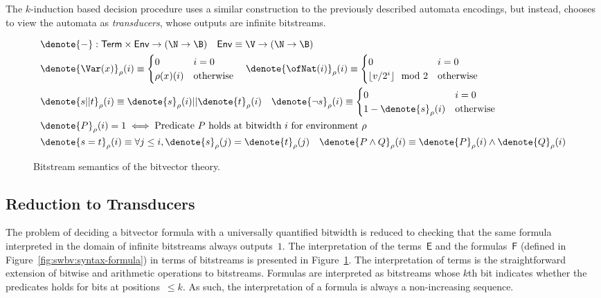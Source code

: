 The $k$-induction based decision procedure uses a similar construction to the
previously described automata encodings, but instead, chooses to view the
automata as \emph{transducers}, whose outputs are infinite bitstreams.

\begin{figure}[t]
\begin{align*}
&\denote{-}: \mathsf{Term} \times \mathsf{Env} \to (\N \to \B) \quad \mathsf{Env} \equiv \V \to (\N \to \B) \\
&\denote{\Var(x)}_\rho(i) \equiv
  \begin{cases}
  0 & i = 0 \\
  \rho(x)(i) & \text{otherwise}
  \end{cases}
\quad \denote{\ofNat(i)}_\rho(i) \equiv
  \begin{cases}
  0 & i = 0 \\
  \lfloor v / 2^i \rfloor \mod 2  & \text{otherwise}
  \end{cases} \\
&\denote{s || t}_\rho(i) \equiv \denote{s}_\rho(i) || \denote{t}_\rho(i)
\quad \denote{\lnot s}_\rho(i) \equiv
  \begin{cases}
    0 & i = 0 \\
    1 - \denote{s}_\rho(i) & \text{otherwise}
  \end{cases}  \\
&\denote{P}_\rho(i) = 1 \iff \text{Predicate $P$ holds at bitwidth $i$ for environment $\rho$} \\
&\denote{s = t}_\rho(i) \equiv \forall j \leq i, \denote{s}_\rho(j) = \denote{t}_\rho(j)
\quad \denote{P \land Q}_\rho(i) \equiv \denote{P}_\rho(i) \land \denote{Q}_\rho(i) \\
\end{align*}
  \caption{Bitstream semantics of the bitvector theory.}
\label{fig:swbv:stx-sem-bv-theory}
\end{figure}

\subsection{Reduction to Transducers}

The problem of deciding a bitvector formula with a universally quantified
bitwidth is reduced to checking that the same formula interpreted in the domain
of infinite bitstreams always outputs~$1$.
%
The interpretation of the terms~$\mathsf E$ and
the formulas~$\mathsf F$ (defined in Figure~\ref{fig:swbv:syntax-formula}) in terms
of bitstreams is presented in Figure~\ref{fig:swbv:stx-sem-bv-theory}.
%
The interpretation of terms is the straightforward extension of bitwise and
arithmetic operations to bitstreams. Formulas are interpreted as bitstreams
whose $k$th bit indicates whether the predicates holds for bits at
positions~$\leq k$.
%
As such, the interpretation of a formula is always a non-increasing sequence.

